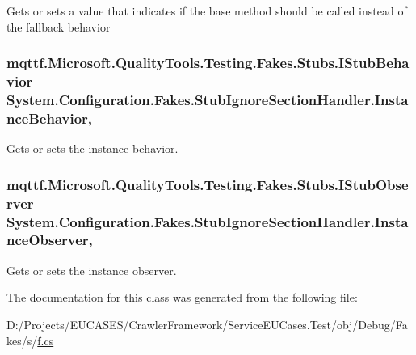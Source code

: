 Gets or sets a value that indicates if the base method should be called instead of the fallback behavior

\hypertarget{class_system_1_1_configuration_1_1_fakes_1_1_stub_ignore_section_handler_aa6deff926d29aa4f354226ee9ebd20f3}{
\subsubsection[{Instance\-Behavior}]{\setlength{\rightskip}{0pt plus 5cm}mqttf.\-Microsoft.\-Quality\-Tools.\-Testing.\-Fakes.\-Stubs.\-I\-Stub\-Behavior System.\-Configuration.\-Fakes.\-Stub\-Ignore\-Section\-Handler.\-Instance\-Behavior\hspace{0.3cm}{\ttfamily [get]}, {\ttfamily [set]}}}\label{class_system_1_1_configuration_1_1_fakes_1_1_stub_ignore_section_handler_aa6deff926d29aa4f354226ee9ebd20f3}


Gets or sets the instance behavior.

\hypertarget{class_system_1_1_configuration_1_1_fakes_1_1_stub_ignore_section_handler_ac856eb0c233877851b2a7a8d5141cf88}{
\subsubsection[{Instance\-Observer}]{\setlength{\rightskip}{0pt plus 5cm}mqttf.\-Microsoft.\-Quality\-Tools.\-Testing.\-Fakes.\-Stubs.\-I\-Stub\-Observer System.\-Configuration.\-Fakes.\-Stub\-Ignore\-Section\-Handler.\-Instance\-Observer\hspace{0.3cm}{\ttfamily [get]}, {\ttfamily [set]}}}\label{class_system_1_1_configuration_1_1_fakes_1_1_stub_ignore_section_handler_ac856eb0c233877851b2a7a8d5141cf88}


Gets or sets the instance observer.



The documentation for this class was generated from the following file\-:\begin{DoxyCompactItemize}
\item 
D\-:/\-Projects/\-E\-U\-C\-A\-S\-E\-S/\-Crawler\-Framework/\-Service\-E\-U\-Cases.\-Test/obj/\-Debug/\-Fakes/s/\hyperlink{s_2f_8cs}{f.\-cs}\end{DoxyCompactItemize}
